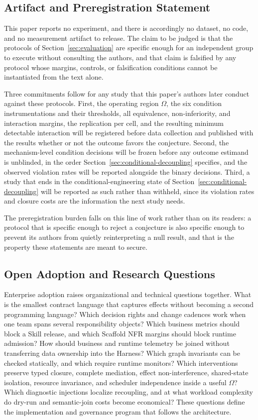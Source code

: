 \subsection{Artifact and Preregistration Statement}

This paper reports no experiment, and there is accordingly no dataset, no code, and no measurement artifact to release. The claim to be judged is that the protocols of Section~\ref{sec:evaluation} are specific enough for an independent group to execute without consulting the authors, and that claim is falsified by any protocol whose margins, controls, or falsification conditions cannot be instantiated from the text alone.

Three commitments follow for any study that this paper's authors later conduct against these protocols. First, the operating region $\Omega$, the six condition instrumentations and their thresholds, all equivalence, non-inferiority, and interaction margins, the replication per cell, and the resulting minimum detectable interaction will be registered before data collection and published with the results whether or not the outcome favors the conjecture. Second, the mechanism-level condition decisions will be frozen before any outcome estimand is unblinded, in the order Section~\ref{sec:conditional-decoupling} specifies, and the observed violation rates will be reported alongside the binary decisions. Third, a study that ends in the conditional-engineering state of Section~\ref{sec:conditional-decoupling} will be reported as such rather than withheld, since its violation rates and closure costs are the information the next study needs.

The preregistration burden falls on this line of work rather than on its readers: a protocol that is specific enough to reject a conjecture is also specific enough to prevent its authors from quietly reinterpreting a null result, and that is the property these statements are meant to secure.

\subsection{Open Adoption and Research Questions}

Enterprise adoption raises organizational and technical questions together. What is the smallest contract language that captures effects without becoming a second programming language? Which decision rights and change cadences work when one team spans several responsibility objects? Which business metrics should block a Skill release, and which Scaffold NFR margins should block runtime admission? How should business and runtime telemetry be joined without transferring data ownership into the Harness? Which graph invariants can be checked statically, and which require runtime monitors? Which interventions preserve typed closure, complete mediation, effect non-interference, shared-state isolation, resource invariance, and scheduler independence inside a useful $\Omega$? Which diagnostic injections localize recoupling, and at what workload complexity do dry-run and semantic-join costs become economical? These questions define the implementation and governance program that follows the architecture.

